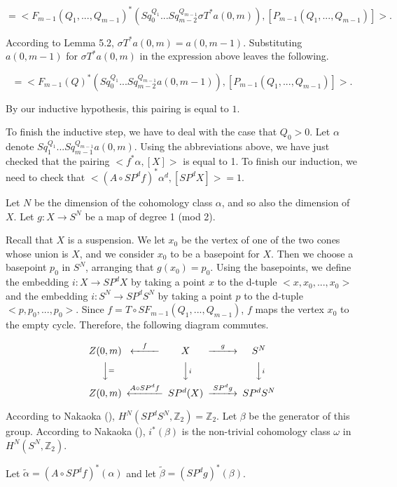 \documentclass{amsart}
\newtheorem*{Theorem 1}{Theorem 1}
\newtheorem*{Theorem 2}{Theorem 2}
\newtheorem*{Theorem 1A}{Theorem 1A}
\newtheorem*{Theorem 2A}{Theorem 2A}
\newtheorem*{vanishing lemma}{Vanishing Lemma}
\numberwithin{equation}{section}
\begin{document}
\vskip3pt

$=<F_{m-1}(Q_1, ..., Q_{m-1})^* (Sq_0^{Q_1} ...
Sq_{m-2}^{Q_{m-1}} \sigma T^* a(0,m)), [P_{m-1}(Q_1, ...,
Q_{m-1})]>.$

\vskip3pt

According to Lemma 5.2, $\sigma T^* a(0,m) = a(0,m-1)$. 
Substituting $a(0,m-1)$ for $\sigma T^* a(0,m)$ in the expression
above leaves the following.

$$= <F_{m-1}(Q)^* (Sq_0^{Q_1} ... Sq_{m-2}^{Q_{m-1}} a(0, m-1)),
[P_{m-1}(Q_1, ..., Q_{m-1})] >.$$

By our inductive hypothesis, this pairing is equal to $1$.

To finish the inductive step, we have to deal with the case that
$Q_0 > 0$.  Let $\alpha$ denote $Sq_1^{Q_1} ...
Sq_{m-1}^{Q_{m-1}} a(0,m)$.  Using the abbreviations above, we
have just checked that the pairing $<f^* \alpha, [X]>$ is equal
to 1.  To finish our induction, we need to check that $<(A \circ
SP^d f)^* \alpha^d, [SP^d X]> = 1$.

Let $N$ be the dimension of the cohomology class $\alpha$, and so
also the dimension of $X$.  Let $g: X \rightarrow S^N$ be a map
of degree 1 (mod 2).

Recall that $X$ is a suspension.  We let $x_0$ be the vertex of
one of the two cones whose union is $X$, and we consider $x_0$ to
be a basepoint for $X$. Then we choose a basepoint $p_0$ in
$S^N$, arranging that $g(x_0) = p_0$.  Using the basepoints, we
define the embedding $i: X \rightarrow SP^d X$ by taking a point
$x$ to the d-tuple $<x, x_0, ..., x_0>$ and the embedding $i: S^N
\rightarrow SP^d S^N$ by taking a point $p$ to the d-tuple $<p,
p_0, ..., p_0>$.  Since $f = T \circ SF_{m-1}(Q_1, ...,
Q_{m-1})$, $f$ maps the vertex $x_0$ to the empty cycle. 
Therefore, the following diagram commutes.

\[
\begin{CD}
Z(0,m) @<f<< X @>g>> S^N \\
@VV=V @VViV @VViV \\
Z(0,m) @<A \circ SP^d f<< SP^d(X) @>SP^d g>> SP^d S^N
\end{CD}
\]

\vskip4pt

According to Nakaoka (\cite{N}), $H^N(SP^d S^N, \mathbb{Z}_2) =
\mathbb{Z}_2$.  Let $\beta$ be the generator of this group. 
According to Nakaoka (\cite{N}), $i^*(\beta)$ is the non-trivial
cohomology class $\omega$ in $H^N(S^N, \mathbb{Z}_2)$.

Let $\tilde \alpha = (A \circ SP^d f)^*(\alpha)$ and let $\tilde \beta = (SP^d g)^* (\beta)$.
\end{document}
